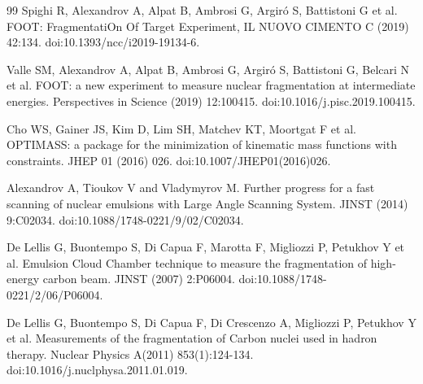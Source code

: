 \documentclass[utf8]{frontiersFPHY} %
\begin{document}
\begin{thebibliography}{99}
 Spighi R, Alexandrov A, Alpat B, Ambrosi G, Argir\'o S, Battistoni G et al. FOOT: FragmentatiOn Of Target Experiment, IL NUOVO CIMENTO C (2019) 42:134. doi:10.1393/ncc/i2019-19134-6.

 Valle SM, Alexandrov A, Alpat B, Ambrosi G, Argir\'o S, Battistoni G, Belcari N  et al. FOOT: a new experiment to measure nuclear fragmentation at intermediate energies. Perspectives in Science (2019) 12:100415. doi:10.1016/j.pisc.2019.100415.

 Cho WS, Gainer JS, Kim D, Lim SH, Matchev KT, Moortgat F et al. OPTIMASS: a package for the minimization of kinematic mass functions with constraints. JHEP 01 (2016) 026. doi:10.1007/JHEP01(2016)026.

 Alexandrov A, Tioukov V and Vladymyrov M. Further progress for a fast scanning of nuclear emulsions with Large Angle Scanning System. JINST (2014) 9:C02034. doi:10.1088/1748-0221/9/02/C02034.




 De Lellis G, Buontempo S, Di Capua F, Marotta F, Migliozzi P, Petukhov Y et al. Emulsion Cloud Chamber technique to measure the fragmentation of high-energy carbon beam. JINST (2007) 2:P06004. doi:10.1088/1748-0221/2/06/P06004.

 De Lellis G, Buontempo S, Di Capua F, Di Crescenzo A, Migliozzi P, Petukhov Y et al. Measurements of the fragmentation of Carbon nuclei used in hadron therapy. Nuclear Physics A(2011) 853(1):124-134. doi:10.1016/j.nuclphysa.2011.01.019.


\end{thebibliography}
\end{document}
